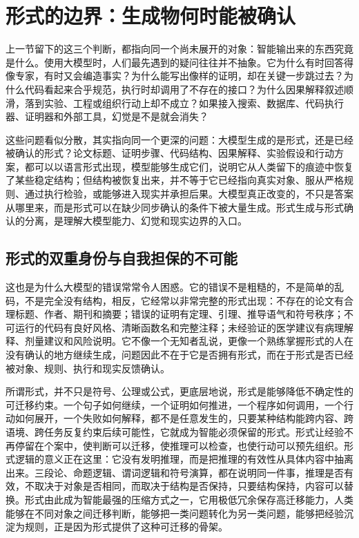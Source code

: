 \section{形式的边界：生成物何时能被确认}

上一节留下的这三个判断，都指向同一个尚未展开的对象：智能输出来的东西究竟是什么。使用大模型时，人们最先遇到的疑问往往并不抽象。它为什么有时回答得像专家，有时又会编造事实？为什么能写出像样的证明，却在关键一步跳过去？为什么代码看起来合乎规范，执行时却调用了不存在的接口？为什么因果解释叙述顺滑，落到实验、工程或组织行动上却不成立？如果接入搜索、数据库、代码执行器、证明器和外部工具，幻觉是不是就会消失？

这些问题看似分散，其实指向同一个更深的问题：大模型生成的是形式，还是已经被确认的形式？论文标题、证明步骤、代码结构、因果解释、实验假设和行动方案，都可以以语言形式出现，模型能够生成它们，说明它从人类留下的痕迹中恢复了某些稳定结构；但结构被恢复出来，并不等于它已经指向真实对象、服从严格规则、通过执行检验，或能够进入现实并承担后果。大模型真正改变的，不只是答案从哪里来，而是形式可以在缺少同步确认的条件下被大量生成。形式生成与形式确认的分离，是理解大模型能力、幻觉和现实边界的入口。

\subsection{形式的双重身份与自我担保的不可能}


这也是为什么大模型的错误常常令人困惑。它的错误不是粗糙的，不是简单的乱码，不是完全没有结构，相反，它经常以非常完整的形式出现：不存在的论文有合理标题、作者、期刊和摘要；错误的证明有定理、引理、推导语气和符号秩序；不可运行的代码有良好风格、清晰函数名和完整注释；未经验证的医学建议有病理解释、剂量建议和风险说明。它不像一个无知者乱说，更像一个熟练掌握形式的人在没有确认的地方继续生成，问题因此不在于它是否拥有形式，而在于形式是否已经被对象、规则、执行和现实反馈确认。

所谓形式，并不只是符号、公理或公式，更底层地说，形式是能够降低不确定性的可迁移约束。一个句子如何继续，一个证明如何推进，一个程序如何调用，一个行动如何展开，一个失败如何解释，都不是任意发生的，只要某种结构能跨内容、跨语境、跨任务反复约束后续可能性，它就成为智能必须保留的形式。形式让经验不再停留在个案中，使判断可以迁移，使推理可以检查，也使行动可以预先组织。形式逻辑的意义正在这里：它没有发明推理，而是把推理的有效性从具体内容中抽离出来。三段论、命题逻辑、谓词逻辑和符号演算，都在说明同一件事，推理是否有效，不取决于对象是否相同，而取决于结构是否保持，只要结构保持，内容可以替换。形式由此成为智能最强的压缩方式之一，它用极低冗余保存高迁移能力，人类能够在不同对象之间迁移判断，能够把一类问题转化为另一类问题，能够把经验沉淀为规则，正是因为形式提供了这种可迁移的骨架。

